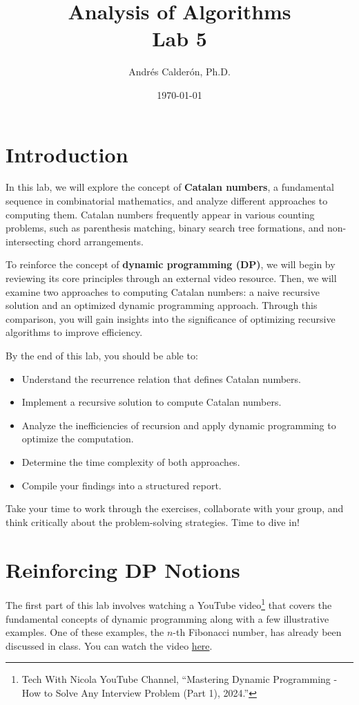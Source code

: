 \documentclass[11pt]{article}
\title{Analysis of Algorithms \\ Lab 5}
\author{Andrés Calderón, Ph.D.}
\date{\today}
\begin{document}
\maketitle

\section{Introduction}

In this lab, we will explore the concept of \textbf{Catalan numbers}, a fundamental sequence in combinatorial mathematics, and analyze different approaches to computing them. Catalan numbers frequently appear in various counting problems, such as parenthesis matching, binary search tree formations, and non-intersecting chord arrangements.

To reinforce the concept of \textbf{dynamic programming (DP)}, we will begin by reviewing its core principles through an external video resource. Then, we will examine two approaches to computing Catalan numbers: a naive recursive solution and an optimized dynamic programming approach. Through this comparison, you will gain insights into the significance of optimizing recursive algorithms to improve efficiency.

By the end of this lab, you should be able to:
\begin{itemize}
    \item Understand the recurrence relation that defines Catalan numbers.
    \item Implement a recursive solution to compute Catalan numbers.
    \item Analyze the inefficiencies of recursion and apply dynamic programming to optimize the computation.
    \item Determine the time complexity of both approaches.
    \item Compile your findings into a structured report.
\end{itemize}

Take your time to work through the exercises, collaborate with your group, and think critically about the problem-solving strategies. Time to dive in!

\section{Reinforcing DP Notions}

The first part of this lab involves watching a YouTube video\footnote{Tech With Nicola YouTube Channel, ``Mastering Dynamic Programming - How to Solve Any Interview Problem (Part 1), 2024.''} that covers the fundamental concepts of dynamic programming along with a few illustrative examples. One of these examples, the $n$-th Fibonacci number, has already been discussed in class. You can watch the video \href{https://youtu.be/Hdr64lKQ3e4?si=PceRA6PHTYlSPlnE}{here}.
\end{document}

